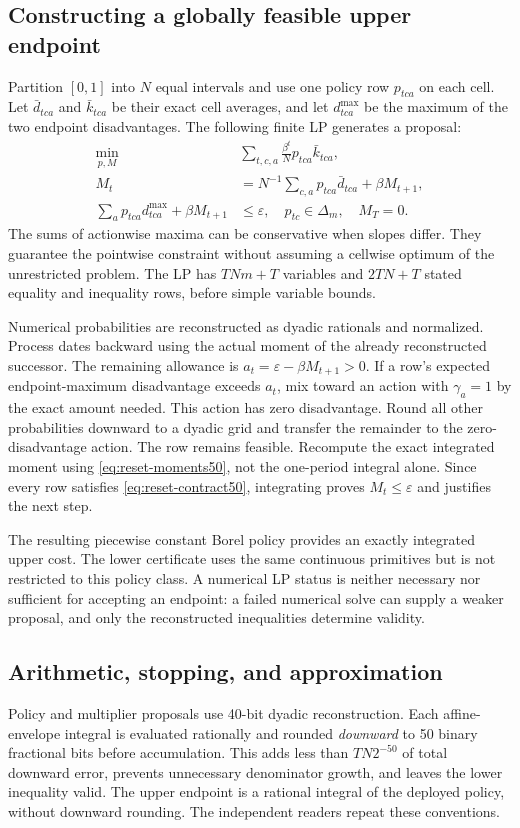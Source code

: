 \subsection{Constructing a globally feasible upper endpoint}
Partition $[0,1]$ into $N$ equal intervals and use one policy row $p_{tca}$ on each cell. Let $\bar d_{tca}$ and $\bar k_{tca}$ be their exact cell averages, and let $d^{\max}_{tca}$ be the maximum of the two endpoint disadvantages. The following finite LP generates a proposal:
\begin{align}
 \min_{p,M}\quad &\sum_{t,c,a}\frac{\beta^t}{N}p_{tca}\bar k_{tca},\nonumber\\
 M_t&=N^{-1}\sum_{c,a}p_{tca}\bar d_{tca}+\beta M_{t+1},\nonumber\\
 \sum_a p_{tca}d^{\max}_{tca}+\beta M_{t+1}&\le\varepsilon,
 \quad p_{tc}\in\Delta_m,\quad M_T=0.\label{eq:reset-lp50}
\end{align}
The sums of actionwise maxima can be conservative when slopes differ. They guarantee the pointwise constraint without assuming a cellwise optimum of the unrestricted problem. The LP has $TNm+T$ variables and $2TN+T$ stated equality and inequality rows, before simple variable bounds.

Numerical probabilities are reconstructed as dyadic rationals and normalized. Process dates backward using the actual moment of the already reconstructed successor. The remaining allowance is $a_t=\varepsilon-\beta M_{t+1}>0$. If a row's expected endpoint-maximum disadvantage exceeds $a_t$, mix toward an action with $\gamma_a=1$ by the exact amount needed. This action has zero disadvantage. Round all other probabilities downward to a dyadic grid and transfer the remainder to the zero-disadvantage action. The row remains feasible. Recompute the exact integrated moment using \eqref{eq:reset-moments50}, not the one-period integral alone. Since every row satisfies \eqref{eq:reset-contract50}, integrating proves $M_t\le\varepsilon$ and justifies the next step.

The resulting piecewise constant Borel policy provides an exactly integrated upper cost. The lower certificate uses the same continuous primitives but is not restricted to this policy class. A numerical LP status is neither necessary nor sufficient for accepting an endpoint: a failed numerical solve can supply a weaker proposal, and only the reconstructed inequalities determine validity.

\subsection{Arithmetic, stopping, and approximation}
Policy and multiplier proposals use 40-bit dyadic reconstruction. Each affine-envelope integral is evaluated rationally and rounded \emph{downward} to 50 binary fractional bits before accumulation. This adds less than $TN2^{-50}$ of total downward error, prevents unnecessary denominator growth, and leaves the lower inequality valid. The upper endpoint is a rational integral of the deployed policy, without downward rounding. The independent readers repeat these conventions.

